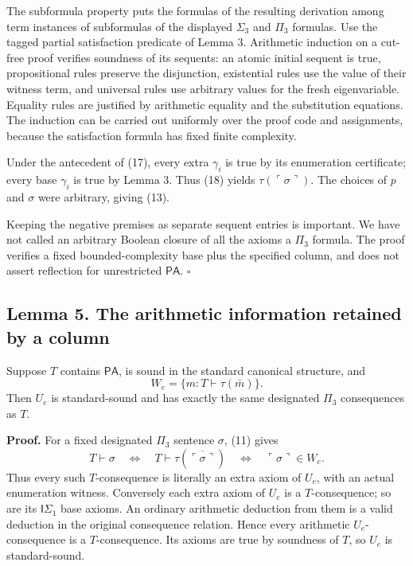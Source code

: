 \documentclass[
  11pt,
  letterpaper,
]{article}
\begin{document}
The subformula property puts the formulas of the resulting derivation
among term instances of subformulas of the displayed \(\Sigma_3\) and
\(\Pi_3\) formulas. Use the tagged partial satisfaction predicate of
Lemma 3. Arithmetic induction on a cut-free proof verifies soundness of
its sequents: an atomic initial sequent is true, propositional rules
preserve the disjunction, existential rules use the value of their
witness term, and universal rules use arbitrary values for the fresh
eigenvariable. Equality rules are justified by arithmetic equality and
the substitution equations. The induction can be carried out uniformly
over the proof code and assignments, because the satisfaction formula
has fixed finite complexity.

Under the antecedent of (17), every extra \(\gamma_i\) is true by its
enumeration certificate; every base \(\gamma_i\) is true by Lemma 3.
Thus (18) yields \(\tau(\ulcorner\sigma\urcorner)\). The choices of
\(p\) and \(\sigma\) were arbitrary, giving (13).

Keeping the negative premises as separate sequent entries is important.
We have not called an arbitrary Boolean closure of all the axioms a
\(\Pi_3\) formula. The proof verifies a fixed bounded-complexity base
plus the specified column, and does not assert reflection for
unrestricted \(\mathsf{PA}\). \hfill\(\square\)

\subsection{Lemma 5. The arithmetic information retained by a
column}\label{lemma-5.-the-arithmetic-information-retained-by-a-column}

Suppose \(T\) contains \(\mathsf{PA}\), is sound in the standard
canonical structure, and \[
W_e=\{m:T\vdash\tau(\bar m)\}.
\tag{19}
\] Then \(U_e\) is standard-sound and has exactly the same designated
\(\Pi_3\) consequences as \(T\).

\textbf{Proof.} For a fixed designated \(\Pi_3\) sentence \(\sigma\),
(11) gives \[
T\vdash\sigma
\quad\Longleftrightarrow\quad
T\vdash\tau(\overline{\ulcorner\sigma\urcorner})
\quad\Longleftrightarrow\quad
\ulcorner\sigma\urcorner\in W_e.
\tag{20}
\] Thus every such \(T\)-consequence is literally an extra axiom of
\(U_e\), with an actual enumeration witness. Conversely each extra axiom
of \(U_e\) is a \(T\)-consequence; so are its \(\mathsf I\Sigma_1\) base
axioms. An ordinary arithmetic deduction from them is a valid deduction
in the original consequence relation. Hence every arithmetic
\(U_e\)-consequence is a \(T\)-consequence. Its axioms are true by
soundness of \(T\), so \(U_e\) is standard-sound.
\end{document}
